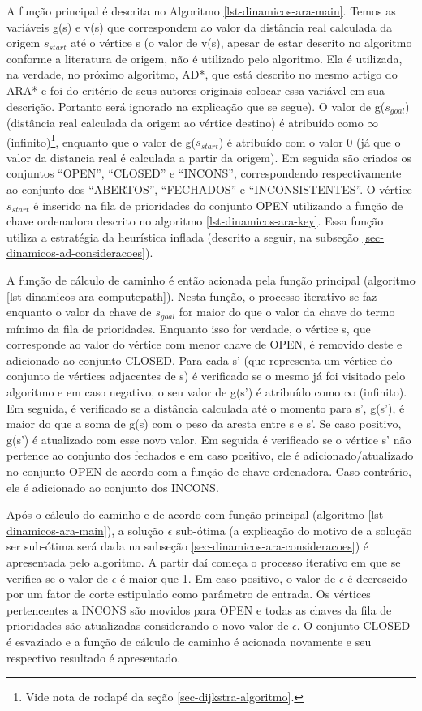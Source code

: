 A função principal é descrita no Algoritmo \ref{lst-dinamicos-ara-main}. Temos as variáveis g(s) e v(s) que correspondem ao valor da distância real calculada da origem $s_{start}$ até o vértice s (o valor de v(s), apesar de estar descrito no algoritmo conforme a literatura de origem, não é utilizado pelo algoritmo. Ela é utilizada, na verdade, no próximo algoritmo, AD*, que está descrito no mesmo artigo do ARA* e foi do critério de seus autores originais colocar essa variável em sua descrição. Portanto será ignorado na explicação que se segue). O valor de g($s_{goal}$) (distância real calculada da origem ao vértice destino) é atribuído como $\infty$ (infinito)\footnote{Vide nota de rodapé da seção \ref{sec-dijkstra-algoritmo}.}, enquanto que o valor de g($s_{start}$) é atribuído com o valor 0 (já que o valor da distancia real é calculada a partir da origem). Em seguida são criados os conjuntos ``OPEN'', ``CLOSED'' e ``INCONS'', correspondendo respectivamente ao conjunto dos ``ABERTOS'', ``FECHADOS'' e ``INCONSISTENTES''. O vértice $s_{start}$ é inserido na fila de prioridades do conjunto OPEN utilizando a função de chave ordenadora descrito no algoritmo \ref{lst-dinamicos-ara-key}. Essa função utiliza a estratégia da heurística inflada (descrito a seguir, na subseção \ref{sec-dinamicos-ad-consideracoes}).

A função de cálculo de caminho é então acionada pela função principal (algoritmo \ref{lst-dinamicos-ara-computepath}). Nesta função, o processo iterativo se faz enquanto o valor da chave de $s_{goal}$ for maior do que o valor da chave do termo mínimo da fila de prioridades. Enquanto isso for verdade, o vértice s, que corresponde ao valor do vértice com menor chave de OPEN, é removido deste e adicionado ao conjunto CLOSED. Para cada s' (que representa um vértice do conjunto de vértices adjacentes de s) é verificado se o mesmo já foi visitado pelo algoritmo e em caso negativo, o seu valor de g(s') é atribuído como $\infty$ (infinito). Em seguida, é verificado se a distância calculada até o momento para s', g(s'), é maior do que a soma de g(s) com o peso da aresta entre s e s'. Se caso positivo, g(s') é atualizado com esse novo valor. Em seguida é verificado se o vértice s' não pertence ao conjunto dos fechados e em caso positivo, ele é adicionado/atualizado no conjunto OPEN de acordo com a função de chave ordenadora. Caso contrário, ele é adicionado ao conjunto dos INCONS.

Após o cálculo do caminho e de acordo com função principal (algoritmo \ref{lst-dinamicos-ara-main}), a solução $\epsilon$ sub-ótima (a explicação do motivo de a solução ser sub-ótima será dada na subseção \ref{sec-dinamicos-ara-consideracoes}) é apresentada pelo algoritmo. A partir daí começa o processo iterativo em que se verifica se o valor de $\epsilon$ é maior que 1. Em caso positivo, o valor de $\epsilon$ é decrescido por um fator de corte estipulado como parâmetro de entrada. Os vértices pertencentes a INCONS são movidos para OPEN e todas as chaves da fila de prioridades são atualizadas considerando o novo valor de $\epsilon$. O conjunto CLOSED é esvaziado e a função de cálculo de caminho é acionada novamente e seu respectivo resultado é apresentado.

